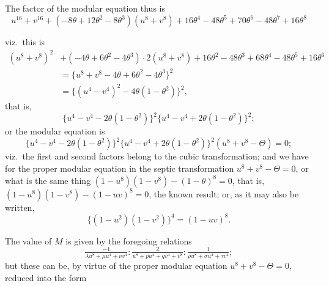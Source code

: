 \documentclass[11pt]{article}
\begin{document}
The factor of the modular equation thus is
\[
u^{16} + v^{16} + (-8\theta + 12\theta^{2} - 8\theta^{3})(u^{8} + v^{8}) + 16\theta^{4} - 48\theta^{5} + 70\theta^{6} - 48\theta^{7} + 16\theta^{8}
\]


\noindent viz.\ this is
\begin{align*}
(u^{8} + v^{8})^{2} &+ (-4\theta + 6\theta^{2} - 4\theta^{3}) \cdot 2(u^{8} + v^{8}) + 16\theta^{2} - 48\theta^{3} + 68\theta^{4} - 48\theta^{5} + 16\theta^{6}\\
&= \{u^{8} + v^{8} - 4\theta + 6\theta^{2} - 4\theta^{3}\}^{2}\\
&= \{(u^{4} - v^{4})^{2} - 4\theta(1 - \theta^{2})\}^{2},
\end{align*}
that is,
\[
\{u^{4} - v^{4} - 2\theta(1 - \theta^{2})\}^{2}\{u^{4} - v^{4} + 2\theta(1 - \theta^{2})\}^{2};
\]
or the modular equation is
\[
\{u^{4} - v^{4} - 2\theta(1 - \theta^{2})\}^{2}\{u^{4} - v^{4} + 2\theta(1 - \theta^{2})\}^{2}(u^{8} + v^{8} - \Theta) = 0;
\]
viz.\ the first and second factors belong to the cubic transformation; and we have for the proper modular equation in the septic transformation $u^{8} + v^{8} - \Theta = 0$, or what is the same thing $(1 - u^{8})(1 - v^{8}) - (1 - \theta)^{8} = 0$, that is, $(1 - u^{8})(1 - v^{8}) - (1 - uv)^{8} = 0$, the known result; or, as it may also be written,
\[
\{(1 - u^{2})(1 - v^{2})\}^{4} = (1 - uv)^{8}.
\]

The value of $M$ is given by the foregoing relations
\[
\tfrac{-1}{\lambda u^{8} + \mu u^{4} + \nu v^{4}} : \tfrac{2}{u^{8} + pu^{4} + qv^{4} + v^{8}} : \tfrac{1}{\rho u^{8} + \sigma u^{4} + \tau v^{4}};
\]
but these can be, by virtue of the proper modular equation $u^{8} + v^{8} - \Theta = 0$, reduced into the form
\end{document}
